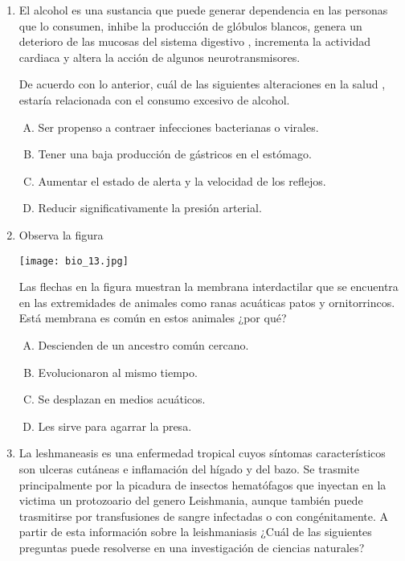 \begin{enumerate}
\item El  alcohol   es  una  sustancia  que  puede generar  dependencia en  las  personas  que  lo  consumen, inhibe  la  producción  de glóbulos blancos, genera un deterioro  de las mucosas  del   sistema  digestivo , incrementa la  actividad  cardiaca  y  altera la acción  de  algunos  neurotransmisores. \label{bio-21}

De  acuerdo  con  lo  anterior,  cuál  de las  siguientes  alteraciones en  la  salud , estaría  relacionada  con el consumo  excesivo  de  alcohol.

\begin{enumerate}[(A)]
\item Ser  propenso a contraer  infecciones  bacterianas o  virales.
\item Tener  una baja producción  de  gástricos  en el estómago.
\item Aumentar  el  estado  de  alerta  y la  velocidad  de los  reflejos.
\item Reducir significativamente  la  presión   arterial.
\end{enumerate}


\item Observa la  figura \label{bio-22}

\begin{flushleft}
\texttt{[image: bio\_13.jpg]} 
\end{flushleft}

Las  flechas    en la figura    muestran  la membrana   interdactilar  que se encuentra en las extremidades de animales  como ranas  acuáticas patos    y ornitorrincos. Está membrana  es común   en estos  animales ¿por qué?

\begin{enumerate}[(A)]
\item Descienden   de  un ancestro común  cercano.
\item Evolucionaron al mismo tiempo.
\item Se desplazan en medios acuáticos.
\item Les sirve para agarrar la presa.
\end{enumerate}

\item La  leshmaneasis  es una  enfermedad   tropical   cuyos   síntomas     característicos   son ulceras cutáneas   e inflamación del  hígado  y del bazo.  Se  trasmite  principalmente   por la picadura   de  insectos  hematófagos    que  inyectan en la victima  un   protozoario  del  genero Leishmania, aunque también  puede trasmitirse por transfusiones   de  sangre infectadas    o con  congénitamente.  A partir  de esta información sobre la leishmaniasis  ¿Cuál de las  siguientes preguntas  puede resolverse      en una investigación de ciencias naturales?  \label{bio-23}       



\end{enumerate}
